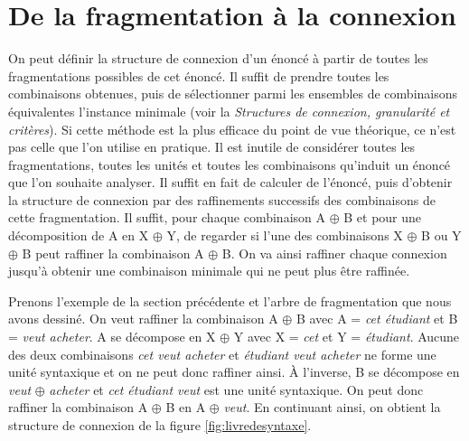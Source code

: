 \section{De la fragmentation à la connexion}\label{sec:3.2.22}

On peut définir la structure de connexion d’un énoncé à partir de toutes les fragmentations possibles de cet énoncé. Il suffit de prendre toutes les combinaisons obtenues, puis de sélectionner parmi les ensembles de combinaisons équivalentes l’instance minimale (voir la  \textit{Structures de connexion, granularité et critères}). Si cette méthode est la plus efficace du point de vue théorique, ce n’est pas celle que l’on utilise en pratique. Il est inutile de considérer toutes les fragmentations, toutes les unités et toutes les combinaisons qu’induit un énoncé que l’on souhaite analyser. Il suffit en fait de calculer   de l’énoncé, puis d’obtenir la structure de connexion par des raffinements successifs des combinaisons de cette fragmentation. Il suffit, pour chaque combinaison A ${\oplus}$ B et pour une décomposition de A en X ${\oplus}$ Y, de regarder si l’une des combinaisons X ${\oplus}$ B ou Y ${\oplus}$ B peut raffiner la combinaison A ${\oplus}$ B. On va ainsi raffiner chaque connexion jusqu’à obtenir une combinaison minimale qui ne peut plus être raffinée.

Prenons l’exemple de la section précédente et l’arbre de fragmentation que nous avons dessiné. On veut raffiner la combinaison A ${\oplus}$ B avec A = \textit{cet étudiant} et B = \textit{veut acheter}. A se décompose en X ${\oplus}$ Y avec X = \textit{cet} et Y = \textit{étudiant}. Aucune des deux combinaisons \textit{cet veut acheter} et \textit{étudiant veut acheter} ne forme une unité syntaxique et on ne peut donc raffiner ainsi. À l’inverse, B se décompose en \textit{veut} ${\oplus}$ \textit{acheter} et \textit{cet étudiant veut} est une unité syntaxique. On peut donc raffiner la combinaison A ${\oplus}$ B en A ${\oplus}$ \textit{veut}. En continuant ainsi, on obtient la structure de connexion de la figure \ref{fig:livredesyntaxe}.

